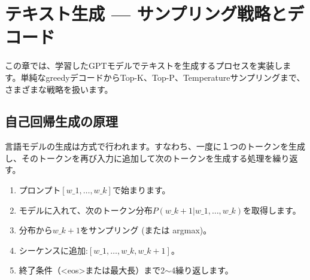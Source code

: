 \chapter{テキスト生成 — サンプリング戦略とデコード}
\label{ch:generation}

この章では、学習したGPTモデルでテキストを生成するプロセスを実装します。単純なgreedyデコードからTop-K、Top-P、Temperatureサンプリングまで、さまざまな戦略を扱います。

\section{自己回帰生成の原理}

言語モデルの生成は方式で行われます。すなわち、一度に１つのトークンを生成し、そのトークンを再び入力に追加して次のトークンを生成する処理を繰り返す。

\begin{enumerate}
\item プロンプト$[w\_1, \dots, w\_k]$で始まります。
\item モデルに入れて、次のトークン分布$P(w\_{k+1} | w\_1, \dots, w\_k)$を取得します。
\item 分布から$w\_{k+1}$をサンプリング (または argmax)。
\item シーケンスに追加:$[w\_1, \dots, w\_k, w\_{k+1}]$。
\item 終了条件（<eos>または最大長）まで2$\sim$4繰り返します。
\end{enumerate}

